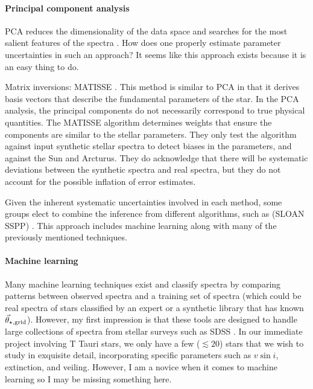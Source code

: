\documentclass[preprint]{aastex} %
\newcommand{\vt}{\vec{\theta}}
\newcommand{\vg}{\vt_{\star, {\rm grid}}}
\begin{document}
\paragraph{Principal component analysis} PCA reduces the dimensionality of the data space and searches for the most salient features of the spectra \citep{ptb14}. How does one properly estimate parameter uncertainties in such an approach? It seems like this approach exists because it is an easy thing to do.

Matrix inversions: MATISSE \citep{rbd06}. This method is similar to PCA in that it derives basis vectors that describe the fundamental parameters of the star. In the PCA analysis, the principal components do not necessarily correspond to true physical quantities. The MATISSE algorithm determines weights that ensure the components are similar to the stellar parameters. They only test the algorithm against input synthetic stellar spectra to detect biases in the parameters, and against the Sun and Arcturus. They do acknowledge that there will be systematic deviations between the synthetic spectra and real spectra, but they do not account for the possible inflation of error estimates.

Given the inherent systematic uncertainties involved in each method, some groups elect to combine the inference from different algorithms, such as (SLOAN SSPP) \citep{lbs+08}. This approach includes machine learning along with many of the previously mentioned techniques.

\paragraph{Machine learning}
Many machine learning techniques exist and classify spectra by comparing patterns between observed spectra and a training set of spectra (which could be real spectra of stars classified by an expert or a synthetic library that has known $\vg$). However, my first impression is that these tools are designed to handle large collections of spectra from stellar surveys such as SDSS \citep{sam+10}. In our immediate project involving T Tauri stars, we only have a few ($\lesssim 20$) stars that we wish to study in exquisite detail, incorporating specific parameters such as $v \sin i$, extinction, and veiling. However, I am a novice when it comes to machine learning so I may be missing something here.
\end{document}
